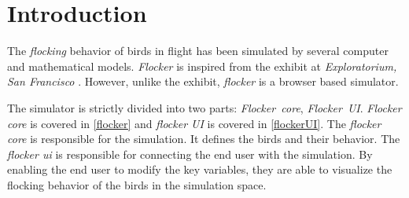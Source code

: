 \documentclass[../main]{subfiles}
\begin{document}
\section{Introduction}
\label{intro}

The {\em flocking} behavior of birds in flight has been simulated by several computer and mathematical models. {\em Flocker} is inspired from the exhibit at {\em Exploratorium, San Francisco} \cite{jillflock}. However, unlike the exhibit, {\em flocker} is a browser based simulator.

The simulator is strictly divided into two parts: \mbox{\em Flocker core}, \mbox{\em Flocker UI}. {\em Flocker core} is covered in \ref{flocker} and {\em flocker UI} is covered in \ref{flockerUI}. The {\em flocker core} is responsible for the simulation. It defines the birds and their behavior. The {\em flocker ui} is responsible for connecting the end user with the simulation. By enabling the end user to modify the key variables, they are able to visualize the flocking behavior of the birds in the simulation space.
\end{document}

